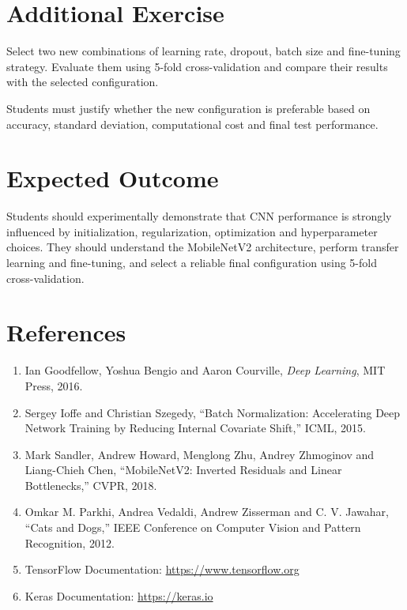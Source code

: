 \documentclass[10pt]{article}
\begin{document}
\section{Additional Exercise}

Select two new combinations of learning rate, dropout, batch size and
fine-tuning strategy. Evaluate them using 5-fold cross-validation and
compare their results with the selected configuration.

Students must justify whether the new configuration is preferable based
on accuracy, standard deviation, computational cost and final test
performance.

\section{Expected Outcome}

Students should experimentally demonstrate that CNN performance is
strongly influenced by initialization, regularization, optimization and
hyperparameter choices. They should understand the MobileNetV2 architecture,
perform transfer learning and fine-tuning, and select a reliable final
configuration using 5-fold cross-validation.

\section{References}

\begin{enumerate}
\item Ian Goodfellow, Yoshua Bengio and Aaron Courville,
\emph{Deep Learning}, MIT Press, 2016.

\item Sergey Ioffe and Christian Szegedy,
``Batch Normalization: Accelerating Deep Network Training by Reducing
Internal Covariate Shift,'' ICML, 2015.

\item Mark Sandler, Andrew Howard, Menglong Zhu, Andrey Zhmoginov and
Liang-Chieh Chen, ``MobileNetV2: Inverted Residuals and Linear
Bottlenecks,'' CVPR, 2018.

\item Omkar M. Parkhi, Andrea Vedaldi, Andrew Zisserman and C. V. Jawahar,
``Cats and Dogs,'' IEEE Conference on Computer Vision and Pattern
Recognition, 2012.

\item TensorFlow Documentation:
\url{https://www.tensorflow.org}

\item Keras Documentation:
\url{https://keras.io}
\end{enumerate}
\end{document}
